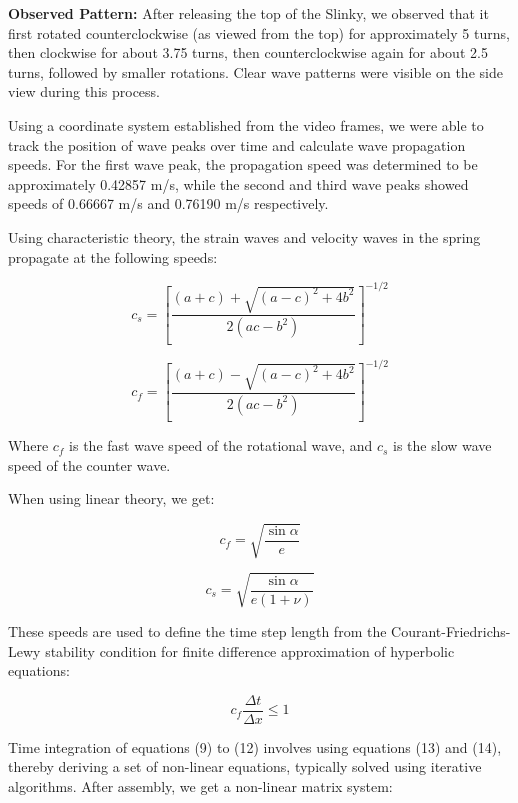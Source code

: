 \documentclass{mcmthesis}  %
\begin{document}
\textbf{Observed Pattern:} After releasing the top of the Slinky, we observed that it first rotated counterclockwise (as viewed from the top) for approximately 5 turns, then clockwise for about 3.75 turns, then counterclockwise again for about 2.5 turns, followed by smaller rotations. Clear wave patterns were visible on the side view during this process.

Using a coordinate system established from the video frames, we were able to track the position of wave peaks over time and calculate wave propagation speeds. For the first wave peak, the propagation speed was determined to be approximately 0.42857 m/s, while the second and third wave peaks showed speeds of 0.66667 m/s and 0.76190 m/s respectively.

Using characteristic theory, the strain waves and velocity waves in the spring propagate at the following speeds:

\begin{equation}
c_s = \left[\frac{(a+c) + \sqrt{(a-c)^2 + 4b^2}}{2(ac - b^2)}\right]^{-1/2}
\end{equation}

\begin{equation}
c_f = \left[\frac{(a+c) - \sqrt{(a-c)^2 + 4b^2}}{2(ac - b^2)}\right]^{-1/2}
\end{equation}

Where $c_f$ is the fast wave speed of the rotational wave, and $c_s$ is the slow wave speed of the counter wave.

When using linear theory, we get:

\begin{equation}
c_f = \sqrt{\frac{\sin \alpha}{e}}
\end{equation}

\begin{equation}
c_s = \sqrt{\frac{\sin \alpha}{e(1 + \nu)}}
\end{equation}

These speeds are used to define the time step length from the Courant-Friedrichs-Lewy stability condition for finite difference approximation of hyperbolic equations:

\begin{equation}
c_f \frac{\Delta t}{\Delta x} \leq 1
\end{equation}

Time integration of equations (9) to (12) involves using equations (13) and (14), thereby deriving a set of non-linear equations, typically solved using iterative algorithms. After assembly, we get a non-linear matrix system:
\end{document}
